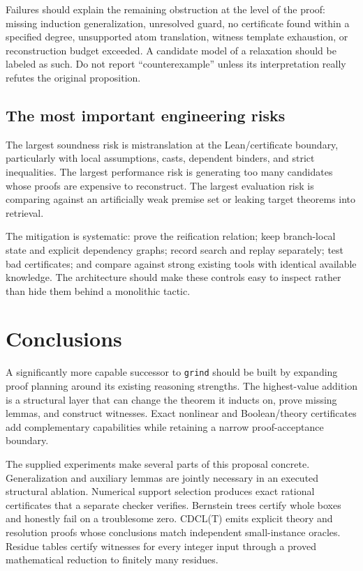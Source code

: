 \documentclass[11pt,letterpaper]{article}
\newcommand{\code}[1]{\texttt{#1}}
\theoremstyle{definition}\newtheorem{definition}[theorem]{Definition}
\theoremstyle{remark}\newtheorem{remark}[theorem]{Remark}
\begin{document}
Failures should explain the remaining obstruction at the level of the proof: missing induction generalization, unresolved guard, no certificate found within a specified degree, unsupported atom translation, witness template exhaustion, or reconstruction budget exceeded. A candidate model of a relaxation should be labeled as such. Do not report ``counterexample'' unless its interpretation really refutes the original proposition.

\subsection{The most important engineering risks}
The largest soundness risk is mistranslation at the Lean/certificate boundary, particularly with local assumptions, casts, dependent binders, and strict inequalities. The largest performance risk is generating too many candidates whose proofs are expensive to reconstruct. The largest evaluation risk is comparing against an artificially weak premise set or leaking target theorems into retrieval.

The mitigation is systematic: prove the reification relation; keep branch-local state and explicit dependency graphs; record search and replay separately; test bad certificates; and compare against strong existing tools with identical available knowledge. The architecture should make these controls easy to inspect rather than hide them behind a monolithic tactic.

\section{Conclusions}
A significantly more capable successor to \code{grind} should be built by expanding proof planning around its existing reasoning strengths. The highest-value addition is a structural layer that can change the theorem it inducts on, prove missing lemmas, and construct witnesses. Exact nonlinear and Boolean/theory certificates add complementary capabilities while retaining a narrow proof-acceptance boundary.

The supplied experiments make several parts of this proposal concrete. Generalization and auxiliary lemmas are jointly necessary in an executed structural ablation. Numerical support selection produces exact rational certificates that a separate checker verifies. Bernstein trees certify whole boxes and honestly fail on a troublesome zero. CDCL(T) emits explicit theory and resolution proofs whose conclusions match independent small-instance oracles. Residue tables certify witnesses for every integer input through a proved mathematical reduction to finitely many residues.
\end{document}
